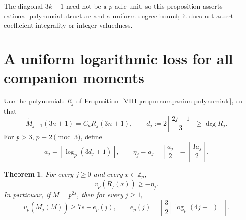 \documentclass[11pt,letterpaper]{article}
\newtheorem{theorem}{Theorem}[section]
\numberwithin{equation}{section}
\begin{document}
The diagonal $3k+1$ need not be a $p$-adic unit, so this proposition
asserts rational-polynomial structure and a uniform degree bound;
it does not assert coefficient integrality or integer-valuedness.

\section{A uniform logarithmic loss for all companion moments}\label{loc-VIII-7}
\label{VIII-sec:E7companionlog}
Use the polynomials $R_j$ of Proposition~\ref{VIII-prop:e-companion-polynomials},
so that
\[
 \widetilde M_{j+1}(3n+1)=C_nR_j(3n+1),\qquad
 d_j:=2\left\lfloor\frac{2j+1}{3}\right\rfloor\ge\deg R_j.
\]
For $p>3$, $p\equiv2\pmod3$, define
\[
 a_j=\left\lfloor\log_p(3d_j+1)\right\rfloor,
 \qquad \eta_j=a_j+\left\lceil\frac{a_j}{2}\right\rceil
 =\left\lceil\frac{3a_j}{2}\right\rceil.
\]
\begin{theorem}\label{VIII-E7:companion-log}
For every $j\ge0$ and every $x\in\mathbb Z_p$,
\[
 v_p(R_j(x))\ge-\eta_j.
\]
In particular, if $M=p^{2s}$, then for every $j\ge1$,
\[
 v_p(\widetilde M_j(M))\ge7s-e_p(j),\qquad
 e_p(j)=\left\lceil\frac32\left\lfloor\log_p(4j+1)\right\rfloor\right\rceil.
\]
\end{theorem}
\end{document}
